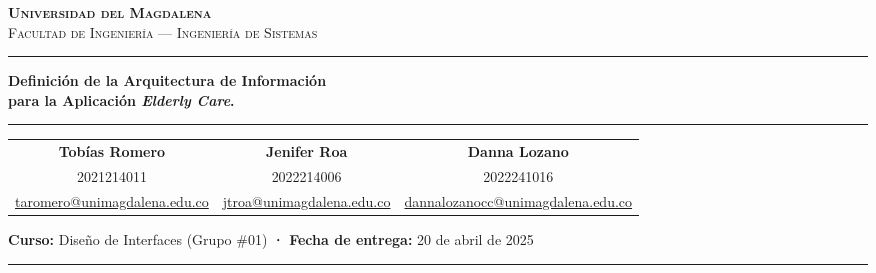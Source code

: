 \documentclass[11pt]{article}
\begin{document}
\thispagestyle{plain}


\begin{center}

  {\scshape\color{uniblue} \textbf{Universidad del Magdalena}} \\[2pt]
  {\small\scshape Facultad de Ingeniería --- Ingeniería de Sistemas}

  \vspace{10pt}
  {\color{uniblue}\rule{\linewidth}{1.5pt}}
  \vspace{6pt}

  {\LARGE\bfseries
    Definición de la Arquitectura de Información\\[5pt]
    para la Aplicación \textit{Elderly Care}.\\[5pt]
  }

  \vspace{8pt}
  {\color{uniblue}\rule{\linewidth}{0.6pt}}
  \vspace{10pt}

  \begin{tabular}{ccc}
    \textbf{Tobías Romero} &
    \textbf{Jenifer Roa} &
    \textbf{Danna Lozano} \\[2pt]
    {\small 2021214011} &
    {\small 2022214006} &
    {\small 2022241016} \\[2pt]
    {\small\ttfamily\href{mailto:taromero@unimagdalena.edu.co}{taromero@unimagdalena.edu.co}} &
    {\small\ttfamily\href{mailto:jtroa@unimagdalena.edu.co}{jtroa@unimagdalena.edu.co}} &
    {\small\ttfamily\href{mailto:dannalozanocc@unimagdalena.edu.co}{dannalozanocc@unimagdalena.edu.co}}
  \end{tabular}

  \vspace{10pt}

  \noindent\colorbox{softgray}{%
    \parbox{0.92\linewidth}{%
      \centering\vspace{4pt}
      {\small
        \textbf{\color{uniblue}Curso:} Diseño de Interfaces (Grupo \#01)
        \quad\textbf{\color{uniblue}·}\quad
        \textbf{\color{uniblue}Fecha de entrega:} 20 de abril de 2025
      }
      \vspace{4pt}
    }%
  }

  \vspace{10pt}
  {\color{uniblue}\rule{\linewidth}{1.5pt}}

\end{center}
\end{document}
